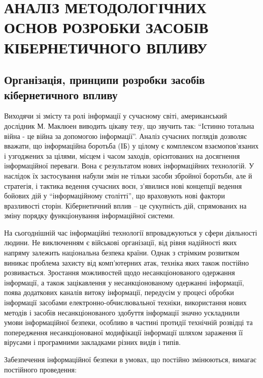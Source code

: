 \chapter{АНАЛІЗ МЕТОДОЛОГІЧНИХ ОСНОВ РОЗРОБКИ ЗАСОБІВ КІБЕРНЕТИЧНОГО ВПЛИВУ }
\label{1section::doc}\label{1section:id1}

\section{Організація, принципи розробки засобів кібернетичного впливу}
\label{1section:id2}
Виходячи зі змісту та ролі інформації у сучасному світі, американський дослідник М. Маклюен виводить цікаву тезу, що звучить так: ``Істинно тотальна війна - це війна за допомогою інформації''.
Аналіз сучасних поглядів дозволяє вважати, що інформаційна боротьба (ІБ) у цілому є комплексом взаємопов'язаних і узгоджених за цілями, місцем і часом заходів, орієнтованих на досягнення інформаційної переваги. Вона є результатом нових інформаційних технологій. У наслідок їх застосування набули змін не тільки засоби збройної боротьби, але й стратегія, і тактика ведення сучасних воєн, з'явилися нові концепції ведення бойових дій у ``інформаційному столітті'', що враховують нові фактори вразливості сторін.
Кібернетичний вплив – це сукупність дій, спрямованих на зміну порядку функціонування інформаційної системи. 

На сьогоднішній час інформаційні технології впроваджуються у сфери  діяльності людини. Не виключенням є військові організації, від рівня надійності яких напряму залежить національна безпека країни. Однак з стрімким розвитком виникає проблема захисту від комп'ютерних атак, техніка яких також постійно розвивається.
Зростання можливостей щодо несанкціонованого одержання інформації, а також зацікавлення у несанкціонованому одержанні інформації, поява додаткових каналів витоку інформації, передусім у процесі обробки інформації засобами електронно-обчислювальної техніки, використання нових методів і засобів несанкціонованого здобуття інформації значно ускладнили умови інформаційної безпеки, особливо в частині протидії технічній розвідці та попередження несанкціонованої модифікації інформації  шляхом зараження її вірусами і програмними  закладками різних видів і типів.

Забезпечення інформаційної безпеки в умовах, що постійно змінюються, вимагає постійного проведення:

